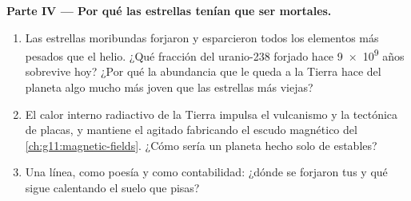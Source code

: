 \begin{problem}
\medskip
\noindent\textbf{Parte IV --- Por qué las estrellas tenían que ser
mortales.}
\begin{enumerate}[resume]
  \item Las estrellas moribundas forjaron y esparcieron todos los
        elementos más pesados que el helio. ¿Qué fracción del uranio-238
        forjado hace \num{9e9} años sobrevive hoy? ¿Por qué la abundancia
        que le queda a la Tierra hace del planeta algo mucho más joven
        que las estrellas más viejas?
  \item El calor interno radiactivo de la Tierra impulsa el vulcanismo y
        la tectónica de placas, y mantiene el  agitado fabricando
        el escudo magnético del \cref{ch:g11:magnetic-fields}. ¿Cómo
        sería un planeta hecho solo de  estables?
  \item Una línea, como poesía y como contabilidad: ¿dónde se forjaron
        tus  y qué sigue calentando el suelo que pisas?
\end{enumerate}
\end{problem}
